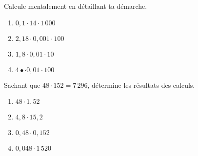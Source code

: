 \begin{exercice}
Calcule mentalement en détaillant ta démarche.
\begin{enumerate} 
 \item $0,1 \cdot 14 \cdot 1\,000$ \dotfill \hspace*{11em}
 
 \item $2,18 \cdot 0,001 \cdot 100$ \dotfill \hspace*{11em}

 \item $1,8 \cdot 0,01 \cdot 10$ \dotfill \hspace*{11em}

 \item $4 •\cdot 0,01 \cdot 100$ \dotfill \hspace*{11em}

 \end{enumerate} %
\end{exercice}


\begin{exercice}
Sachant que $48 \cdot 152 = 7\,296$, détermine les résultats des calculs.
\begin{enumerate} 
 \item $48 \cdot 1,52$ \dotfill \hspace*{11em}
 
 \item $4,8 \cdot 15,2$ \dotfill \hspace*{11em}
 
 \item $0,48 \cdot 0,152$ \dotfill \hspace*{11em}
 
 \item $0,048 \cdot 1\,520$ \dotfill \hspace*{11em}

 \end{enumerate}  %
\end{exercice}


